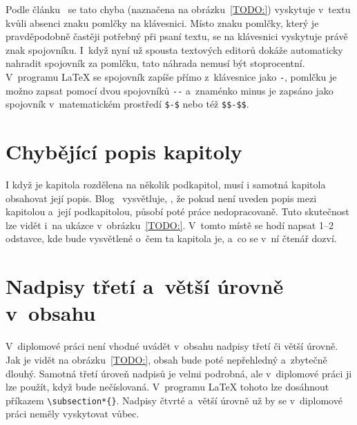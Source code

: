 Podle článku~\cite{Zaklady_typografie:Slezakova} se tato chyba (naznačena na
obrázku~\ref{TODO:}) vyskytuje v~textu kvůli absenci znaku pomlčky na klávesnici.
Místo znaku pomlčky, který je pravděpodobně častěji potřebný při psaní textu,
se na klávesnici vyskytuje právě znak spojovníku. I~když nyní už spousta
textových editorů dokáže automaticky nahradit spojovník za pomlčku, tato náhrada
nemusí být stoprocentní. V~programu {\LaTeX} se spojovník zapíše přímo
z~klávesnice jako \verb|-|,
pomlčku je možno zapsat pomocí dvou spojovníků \verb|--| a~znaménko minus je
zapsáno jako spojovník v~matematickém prostředí \verb|$-$| nebo též \verb|$$-$$|.



\section{Chybějící popis kapitoly}

I když je kapitola rozdělena na několik podkapitol, musí i samotná kapitola
obsahovat její popis. Blog~\cite{Leany_blog} vysvětluje, , že pokud není uveden
popis mezi kapitolou a~její podkapitolou, působí poté práce nedopracovaně. Tuto
skutečnost lze vidět i~na ukázce v~obrázku~\ref{TODO:}. V~tomto místě
se hodí napsat 1--2 odstavce, kde bude vysvětlené o~čem ta kapitola je, a~co se
v~ní čtenář dozví.


\section{Nadpisy třetí a~větší úrovně v~obsahu}
V~diplomové práci není vhodné uvádět v~obsahu nadpisy třetí či větší úrovně.
Jak je vidět na obrázku~\ref{TODO:}, obsah bude poté nepřehledný a~zbytečně
dlouhý. Samotná třetí úroveň nadpisů je velmi podrobná, ale v~diplomové práci
ji lze použít, když bude nečíslovaná. V~programu {\LaTeX} tohoto lze dosáhnout
příkazem \verb|\subsection*{}|. Nadpisy čtvrté a~větší úrovně už by se v~diplomové
práci neměly vyskytovat vůbec.



